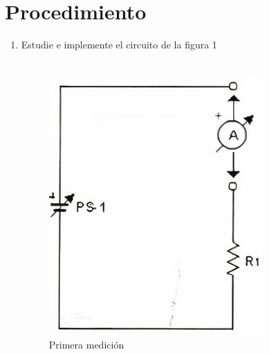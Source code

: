 \section{Procedimiento}
\begin{enumerate}
	\item Estudie e implemente el circuito de la figura 1
	\\
	\\
	\begin{figure}[h]
		\begin{minipage}{0.4\textwidth}
			\centering
			\includegraphics[width=\textwidth]{imagenes/4.1}
			\caption{Primera medición}
			\label{fig:imagen1}
		\end{minipage}%
		\begin{minipage}{0.5\textwidth}
			\centering

\end{minipage}
\end{figure}
\end{enumerate}
